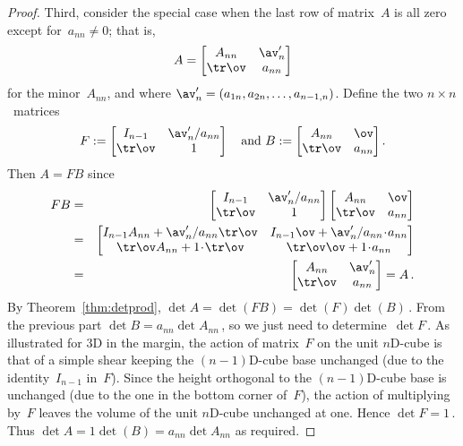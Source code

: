 \begin{proof}
Third, consider the special case when the last row of matrix~\(A\) is all zero except for~\(a_{nn}\neq0\); that is, 
\begin{equation*}
A=\begin{bmatrix} A_{nn}&\av_n'\\\tr\ov&a_{nn} \end{bmatrix}
\end{equation*}
for the minor~\(A_{nn}\), and where \(\av'_n=(a_{1n},a_{2n},\ldots,a_{n-1,n})\).
Define the two \(n\times n\)~matrices
\begin{equation*}
F:=\begin{bmatrix} I_{n-1}&\av'_n/a_{nn}\\\tr\ov& 1 \end{bmatrix}
\quad\text{and }
B:=\begin{bmatrix} A_{nn}&\ov\\\tr\ov&a_{nn} \end{bmatrix}.
\end{equation*}
Then \(A=FB\) since
\begin{eqnarray*}
FB&=&\begin{bmatrix} I_{n-1}&\av'_n/a_{nn}\\\tr\ov& 1 \end{bmatrix}
\begin{bmatrix} A_{nn}&\ov\\\tr\ov&a_{nn} \end{bmatrix}
\\&=&\begin{bmatrix} I_{n-1}A_{nn}+\av'_n/a_{nn}\tr\ov &
I_{n-1}\ov+\av'_n/a_{nn}\cdot a_{nn}\\
\tr\ov A_{nn}+1\cdot\tr\ov &
\tr\ov\ov+1\cdot a_{nn}  \end{bmatrix}
\\&=&\begin{bmatrix} A_{nn} &
\av'_n\\
\tr\ov  &
a_{nn}  \end{bmatrix} =A\,.
\end{eqnarray*}
By Theorem~\ref{thm:detprod}, \(\det A=\det(FB)=\det(F)\det(B)\)\,.
From the previous part \(\det B=a_{nn}\det A_{nn}\)\,, so we just need to determine~\(\det F\)\,.
As illustrated for 3D in the margin, the action of matrix~\(F\) on the unit \(n\)D-cube is that of a simple shear keeping the \((n-1)\)D-cube base unchanged (due to the identity~\(I_{n-1}\) in~\(F\)).
Since the height orthogonal to the \((n-1)\)D-cube base is unchanged (due to the one in the bottom corner of~\(F\)), the action of multiplying by~\(F\) leaves the volume of the unit \(n\)D-cube unchanged at one.
Hence \(\det F=1\)\,.
Thus \(\det A=1\det(B)=a_{nn}\det A_{nn}\) as required.


\end{proof}
